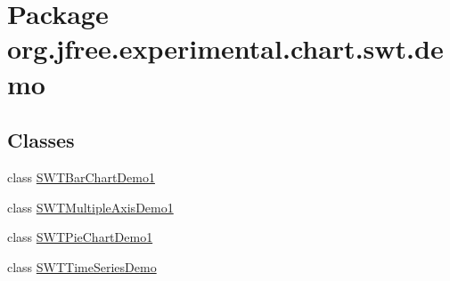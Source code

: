 \hypertarget{namespaceorg_1_1jfree_1_1experimental_1_1chart_1_1swt_1_1demo}{}\section{Package org.\+jfree.\+experimental.\+chart.\+swt.\+demo}
\label{namespaceorg_1_1jfree_1_1experimental_1_1chart_1_1swt_1_1demo}
\subsection*{Classes}
\begin{DoxyCompactItemize}
\item 
class \mbox{\hyperlink{classorg_1_1jfree_1_1experimental_1_1chart_1_1swt_1_1demo_1_1_s_w_t_bar_chart_demo1}{S\+W\+T\+Bar\+Chart\+Demo1}}
\item 
class \mbox{\hyperlink{classorg_1_1jfree_1_1experimental_1_1chart_1_1swt_1_1demo_1_1_s_w_t_multiple_axis_demo1}{S\+W\+T\+Multiple\+Axis\+Demo1}}
\item 
class \mbox{\hyperlink{classorg_1_1jfree_1_1experimental_1_1chart_1_1swt_1_1demo_1_1_s_w_t_pie_chart_demo1}{S\+W\+T\+Pie\+Chart\+Demo1}}
\item 
class \mbox{\hyperlink{classorg_1_1jfree_1_1experimental_1_1chart_1_1swt_1_1demo_1_1_s_w_t_time_series_demo}{S\+W\+T\+Time\+Series\+Demo}}
\end{DoxyCompactItemize}
